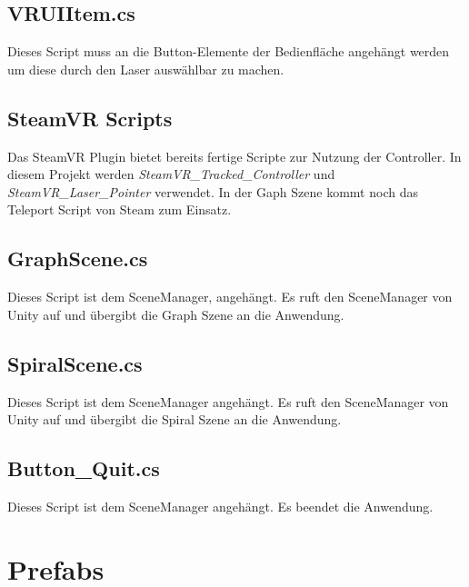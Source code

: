 \subsection{VRUIItem.cs}
\label{VRUIItem}
Dieses Script muss an die Button-Elemente der \glqq Bedienfläche\grqq{} angehängt werden um diese durch den Laser auswählbar zu machen.

\subsection{SteamVR Scripts}
\label{steamVR}
Das SteamVR Plugin bietet bereits fertige Scripte zur Nutzung der Controller. In diesem Projekt werden \emph{SteamVR\_Tracked\_Controller} und  \emph{SteamVR\_Laser\_Pointer} verwendet. In der Gaph Szene kommt noch das Teleport Script von Steam zum Einsatz.

\subsection{GraphScene.cs}
\label{graphscene}
Dieses Script ist dem SceneManager, angehängt. Es ruft den SceneManager von Unity auf und übergibt die Graph Szene an die Anwendung.

\subsection{SpiralScene.cs}
\label{spiralscene}
Dieses Script ist dem SceneManager angehängt. Es ruft den SceneManager von Unity auf und übergibt die Spiral Szene an die Anwendung.

\subsection{Button\_Quit.cs}
\label{ButtonQuit}
Dieses Script ist dem SceneManager angehängt. Es beendet die Anwendung. 

\section{Prefabs}

